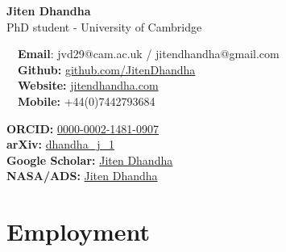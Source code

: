 \documentclass{article}
\begin{document}
\small %


\begin{center}
\huge
\textbf{Jiten Dhandha} \\
\normalsize
PhD student - University of Cambridge \\
\end{center}

\begin{minipage}[ht]{0.6\linewidth}
	\faEnvelope~~\textbf{Email}: jvd29@cam.ac.uk / jitendhandha@gmail.com\\
	\faGithub~~\textbf{Github:} \href{https://github.com/JitenDhandha}{github.com/JitenDhandha}\\
	\faGlobe~~\textbf{Website:} \href{https://jitendhandha.com}{jitendhandha.com} \\
  \faPhone~~\textbf{Mobile:} +44(0)7442793684 \\
\end{minipage}
\begin{minipage}[ht]{0.34\linewidth}
	\begin{flushright}
    \textbf{ORCID:} \href{https://orcid.org/0000-0002-1481-0907}{0000-0002-1481-0907} \\
    \textbf{arXiv:} \href{https://arxiv.org/a/dhandha_j_1.html}{dhandha\_j\_1} \\
    \textbf{Google Scholar:} \href{https://scholar.google.com/citations?user=RjlmcA0AAAAJ}{Jiten Dhandha} \\
    \textbf{NASA/ADS:} \href{https://ui.adsabs.harvard.edu/search/?q=author%3A%22Dhandha%2C+Jiten%22}{Jiten Dhandha} \\
	\end{flushright}
\end{minipage}

\section*{Employment}
\end{document}
